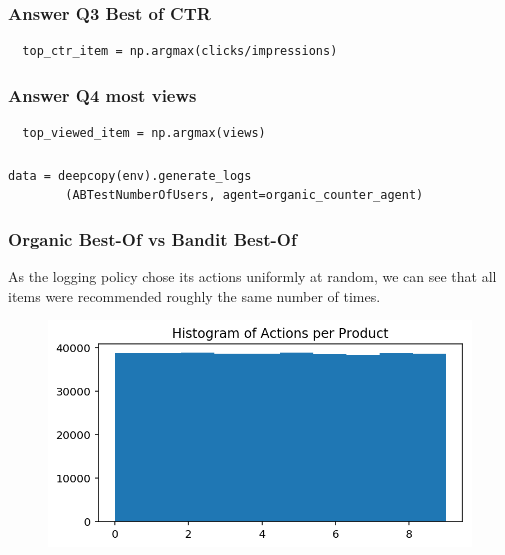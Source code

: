 \begin{frame}[fragile]
  \frametitle{Answer Q3 Best of CTR}
\begin{verbatim}
  top_ctr_item = np.argmax(clicks/impressions)
\end{verbatim}
\end{frame}


\begin{frame}[fragile]
  \frametitle{Answer Q4 most views}
\begin{verbatim}
  top_viewed_item = np.argmax(views)
\end{verbatim}
\end{frame}




\begin{frame}[fragile]
  \frametitle{}
  \begin{small}
\begin{verbatim}
data = deepcopy(env).generate_logs
        (ABTestNumberOfUsers, agent=organic_counter_agent)
\end{verbatim}
\end{small}
\end{frame}




\begin{frame}
\frametitle{Organic Best-Of vs Bandit Best-Of}

As the logging policy chose its actions uniformly at random, we can see that all items were recommended roughly the same number of times.

\begin{figure}[h!]
\includegraphics[scale=0.4]{images/organic_bestof0.png}
\centering
\label{motex1}
\end{figure}
\end{frame}

